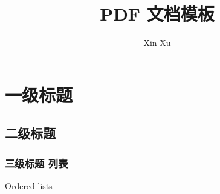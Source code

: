 \documentclass[a4paper,11pt,onecolumn]{article}
\begin{document}
\title{PDF 文档模板}
\author{Xin Xu}

\maketitle
\tableofcontents

\newpage

\section{一级标题}

\subsection{二级标题}

\subsubsection{三级标题 列表}
\noindent
Ordered lists
\end{document}
